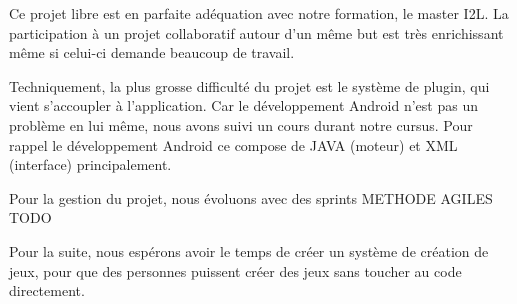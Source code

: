 Ce projet libre est en parfaite adéquation avec notre formation, le master I2L. La participation à un projet collaboratif autour d'un m\^{e}me but est très enrichissant m\^{e}me si celui-ci demande beaucoup de travail.


Techniquement, la plus grosse difficulté du projet est le système de plugin, qui vient s'accoupler à l'application. Car le développement Android n'est pas un problème en lui m\^{e}me, nous avons suivi un cours durant notre cursus. Pour rappel le développement Android ce compose de JAVA (moteur) et XML (interface) principalement.


Pour la gestion du projet, nous évoluons avec des sprints METHODE AGILES TODO


Pour la suite, nous espérons avoir le temps de créer un système de création de jeux, pour que des personnes puissent créer des jeux sans toucher au code directement.


